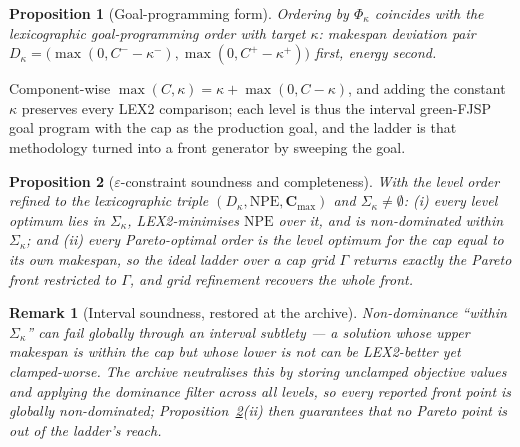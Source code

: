 \documentclass[preprint,12pt]{elsarticle}
\newtheorem{proposition}{Proposition}
\newtheorem{remark}{Remark}
\newcommand{\NPE}{\mathrm{NPE}}
\begin{document}
\begin{proposition}[Goal-programming form]\label{prop:goal}
Ordering by $\Phi_\kappa$ coincides with the lexicographic goal-programming
order with target $\kappa$: makespan deviation pair
$D_\kappa=\bigl(\max(0,C^--\kappa^-),\max(0,C^+-\kappa^+)\bigr)$ first,
energy second.
\end{proposition}
\noindent Component-wise $\max(C,\kappa)=\kappa+\max(0,C-\kappa)$, and adding
the constant $\kappa$ preserves every LEX2 comparison; each level is thus the
interval green-FJSP goal program with the cap as the production goal, and the
ladder is that methodology turned into a front generator by sweeping the goal.

\begin{proposition}[$\varepsilon$-constraint soundness and completeness]
\label{prop:eps}
With the level order refined to the lexicographic triple
$(D_\kappa,\mathbf{\NPE},\mathbf{C}_{\max})$ and $\Sigma_\kappa\neq\emptyset$:
(i) every level optimum lies in $\Sigma_\kappa$, LEX2-minimises $\mathbf{\NPE}$
over it, and is non-dominated within $\Sigma_\kappa$; and (ii) every
Pareto-optimal order is the level optimum for the cap equal to its own
makespan, so the ideal ladder over a cap grid $\Gamma$ returns exactly the
Pareto front restricted to $\Gamma$, and grid refinement recovers the whole
front.
\end{proposition}

\begin{remark}[Interval soundness, restored at the archive]
\label{rem:soundness}
Non-dominance ``within $\Sigma_\kappa$'' can fail globally through an interval
subtlety --- a solution whose upper makespan is within the cap but whose lower
is not can be LEX2-better yet clamped-worse. The archive neutralises this by
storing \emph{unclamped} objective values and applying the dominance filter
across all levels, so every reported front point is globally non-dominated;
Proposition~\ref{prop:eps}(ii) then guarantees that no Pareto point is out of
the ladder's reach.
\end{remark}
\end{document}
